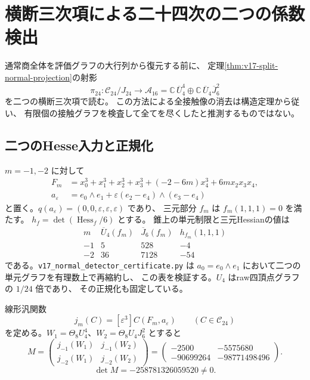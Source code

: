 \documentclass[a4paper,11pt]{ltjsarticle}
\theoremstyle{definition}
\begin{document}

\section{横断三次項による二十四次の二つの係数検出}
\label{sec:v17-normal-third-jet-detectors}

通常商全体を評価グラフの大行列から復元する前に、
定理\ref{thm:v17-split-normal-projection}の射影
\[
 \pi_{24}:\mathcal C_{24}/J_{24}\longrightarrow
 \mathcal A_{16}
 =\mathbb C\,\overline U_4^4\oplus
   \mathbb C\,\overline U_4\overline J_6^2
\]
を二つの横断三次項で読む。
この方法による全接触像の消去は構造定理から従い、
有限個の接触グラフを検査して全てを尽くしたと推測するものではない。

\subsection{二つのHesse入力と正規化}

$m=-1,-2$ に対して
\[
\begin{split}
 F_m&=x_0^3+x_1^3+x_2^3+x_3^3+(-2-6m)x_4^3+6m x_2x_3x_4,\\
 a_\varepsilon&=e_0\wedge e_1+
             \varepsilon(e_2-e_4)\wedge(e_3-e_4)
\end{split}
\]
と置く。$q(a_\varepsilon)=(0,0,\varepsilon,\varepsilon,\varepsilon)$ であり、
三元部分 $f_m$ は $f_m(1,1,1)=0$ を満たす。
$h_f=\det(\operatorname{Hess}_f/6)$ とする。
錐上の単元制限と三元Hessianの値は
\[
\begin{array}{c|rrr}
 m&\overline U_4(f_m)&\overline J_6(f_m)&h_{f_m}(1,1,1)\\ \hline
 -1&5&528&-4\\
 -2&36&7128&-54
\end{array}
\]
である。\nolinkurl{v17_normal_detector_certificate.py} は
$a_0=e_0\wedge e_1$ において二つの単元グラフを有理数上で再縮約し、
この表を検証する。$U_4$ はraw四頂点グラフの $1/24$ 倍であり、
その正規化も固定している。

線形汎関数
\[
 j_m(C)=[\varepsilon^3]C(F_m,a_\varepsilon)
 \qquad(C\in\mathcal C_{24})
\]
を定める。$W_1=\Theta_8U_4^4$、$W_2=\Theta_8U_4J_6^2$ とすると
\begin{equation}\label{eq:v17-normal-jet-matrix}
 M=\begin{pmatrix}
 j_{-1}(W_1)&j_{-1}(W_2)\\
 j_{-2}(W_1)&j_{-2}(W_2)
 \end{pmatrix}
 =
 \begin{pmatrix}
 -2500&-5575680\\
 -90699264&-98771498496
 \end{pmatrix}.
\end{equation}
\[
 \det M=-258781326059520\ne0.
\]
\end{document}
